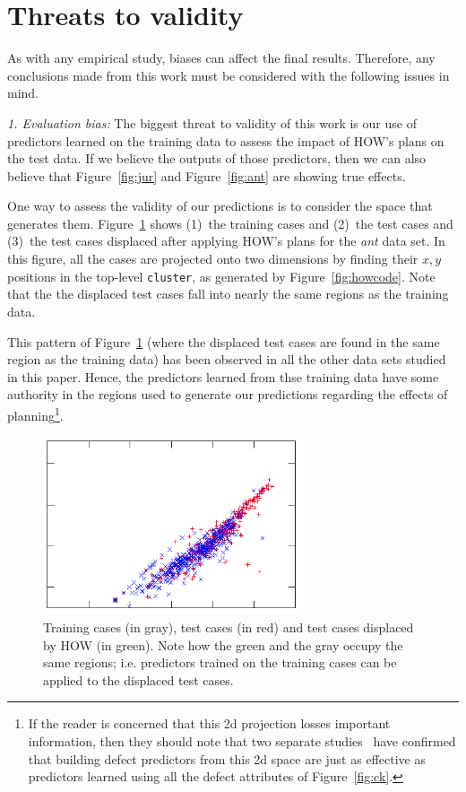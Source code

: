 \documentclass[conference]{IEEEtran}
\newcommand{\fig}[1]{Figure~\ref{fig:#1}}
\begin{document}
\section{Threats to validity}

 

As with any empirical study, biases can affect the final results. Therefore, any
conclusions made from this work must be considered with the following issues in
mind.


{\em 1. Evaluation bias:} The biggest threat to validity of this work is our use
of predictors learned on the training data to assess the impact of HOW's plans
on the test data.
If we believe the outputs of those predictors, then we can also believe that
\fig{jur} and \fig{ant} are showing true effects.  

One way to assess the validity of our predictions is to consider the space that generates
them. \fig{howxy} shows (1)~the training cases and (2)~the test cases and (3)~the
test cases displaced after applying HOW's plans for the {\em ant} data set.
In this figure, all the cases are projected onto two dimensions by   finding their $x,y$ positions in the top-level {\tt cluster},
as generated by \fig{howcode}. Note that the  the   displaced test
cases   fall into nearly the same regions as the training data. 

This pattern of \fig{howxy} (where the displaced test cases are found in the same
region as the training data) has been observed in all the other data sets studied in this
paper. Hence, the
predictors learned from thse training data have some authority in the regions
used to generate our predictions regarding the effects of planning\footnote{If the reader is concerned that this 2d projection
losses important information, then they should note that two separate  studies~\cite{papa13,divya15}
have confirmed that building defect predictors from this 2d space are just as effective
as predictors learned using all the defect attributes of \fig{ck}.}. 


\begin{figure}
\begin{center}\includegraphics[width=3in]{figs/2d.png}\end{center}
\caption{Training cases (in gray), test cases (in red) and 
test cases displaced by HOW (in green). Note how the green and the gray occupy
the same regions; i.e. predictors trained on the training cases can be applied
to the displaced test cases.}\label{fig:howxy}
\end{figure}
\end{document}
